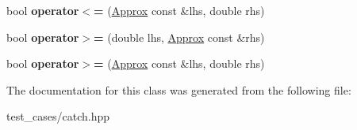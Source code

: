 \begin{DoxyCompactItemize}
bool {\bfseries operator$<$=} (\hyperlink{classCatch_1_1Detail_1_1Approx}{Approx} const \&lhs, double rhs)
\item 
\mbox{\label{classCatch_1_1Detail_1_1Approx_a4e60095c615a0e6bdd6e8663cd24090b}} 
bool {\bfseries operator$>$=} (double lhs, \hyperlink{classCatch_1_1Detail_1_1Approx}{Approx} const \&rhs)
\item 
\mbox{\label{classCatch_1_1Detail_1_1Approx_adaba11ee9aabb4d51d4855f09aa7f7df}} 
bool {\bfseries operator$>$=} (\hyperlink{classCatch_1_1Detail_1_1Approx}{Approx} const \&lhs, double rhs)
\end{DoxyCompactItemize}


The documentation for this class was generated from the following file\+:\begin{DoxyCompactItemize}
\item 
test\+\_\+cases/catch.\+hpp\end{DoxyCompactItemize}
